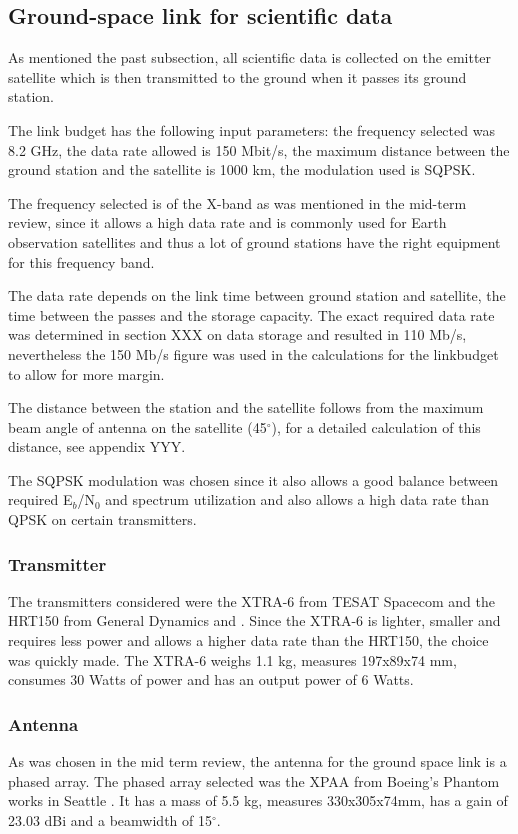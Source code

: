 \subsection{Ground-space link for scientific data}
As mentioned the past subsection, all scientific data is collected on the emitter satellite which is then transmitted to the ground when it passes its ground station.

The link budget has the following input parameters: the frequency selected was 8.2 GHz, the data rate allowed is 150 Mbit/s, the maximum distance between the ground station and the satellite is 1000 km, the modulation used is SQPSK.

The frequency selected is of the X-band as was mentioned in the mid-term review, since it allows a high data rate and is commonly used for Earth observation satellites and thus a lot of ground stations have the right equipment for this frequency band.

The data rate depends on the link time between ground station and satellite, the time between the passes and the storage capacity. The exact required data rate was determined in section XXX on data storage and resulted in 110 Mb/s, nevertheless the 150 Mb/s figure was used in the calculations for the linkbudget to allow for more margin.

The distance between the station and the satellite follows from the maximum beam angle of antenna on the satellite (45$^{\circ}$), for a detailed calculation of this distance, see appendix YYY.

The SQPSK modulation was chosen since it also allows a good balance between required E$_{b}$/N$_{0}$ and spectrum utilization and also allows a high data rate than QPSK on certain transmitters.

\subsubsection{Transmitter}
The transmitters considered were the XTRA-6 from TESAT Spacecom \cite{TESATxtra} and the HRT150 from General Dynamics and \cite{HRT150}. Since the XTRA-6 is lighter, smaller and requires less power and allows a higher data rate than the HRT150, the choice was quickly made.
The XTRA-6 weighs 1.1 kg, measures 197x89x74 mm, consumes 30 Watts of power and has an output power of 6 Watts.

\subsubsection{Antenna}
As was chosen in the mid term review, the antenna for the ground space link is a phased array. The phased array selected was the XPAA from Boeing's Phantom works in Seattle \cite{XPAA}. It has a mass of 5.5 kg, measures 330x305x74mm, has a gain of 23.03 dBi and a beamwidth of 15$^{\circ}$.

